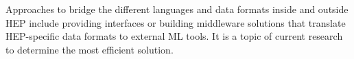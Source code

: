 
Approaches to bridge the different languages and data formats inside and outside HEP include  providing interfaces or building middleware solutions that translate HEP-specific data formats to external ML tools. It is a topic of current research to determine the most efficient solution.



